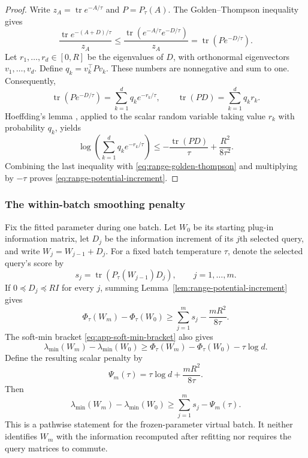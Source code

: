 \documentclass[10pt,twoside,letterpaper]{article}
\newcommand{\tr}{\operatorname{tr}}
\begin{document}
\begin{proof}
Write $z_A=\tr e^{-A/\tau}$ and $P=P_\tau(A)$.
The Golden--Thompson inequality \citep{Golden1965,Thompson1965}
gives
\begin{equation}
\frac{\tr e^{-(A+D)/\tau}}{z_A}
\le
\frac{\tr\!\left(e^{-A/\tau}e^{-D/\tau}\right)}{z_A}
=
\tr\!\left(Pe^{-D/\tau}\right).
\label{eq:range-golden-thompson}
\end{equation}
Let $r_1,\ldots,r_d\in[0,R]$ be the eigenvalues of $D$, with
orthonormal eigenvectors $v_1,\ldots,v_d$. Define
$q_k=v_k^\top Pv_k$. These numbers are nonnegative and sum to one.
Consequently,
\begin{equation}
\tr\!\left(Pe^{-D/\tau}\right)
=\sum_{k=1}^d q_k e^{-r_k/\tau},
\qquad
\tr(PD)=\sum_{k=1}^d q_k r_k.
\end{equation}
Hoeffding's lemma \citep{Hoeffding1963}, applied to the scalar
random variable taking value $r_k$ with probability $q_k$, yields
\begin{equation}
\log\!\left(\sum_{k=1}^d q_k e^{-r_k/\tau}\right)
\le
-\frac{\tr(PD)}{\tau}+\frac{R^2}{8\tau^2}.
\label{eq:range-hoeffding}
\end{equation}
Combining the last inequality with
\eqref{eq:range-golden-thompson} and multiplying by $-\tau$
proves \eqref{eq:range-potential-increment}.
\end{proof}

\subsubsection{The within-batch smoothing penalty}

Fix the fitted parameter during one batch. Let $W_0$ be its starting
plug-in information matrix, let $D_j$ be the information increment
of its $j$th selected query, and write $W_j=W_{j-1}+D_j$.
For a fixed batch temperature $\tau$, denote the selected query's
score by
\begin{equation}
s_j=\tr\!\left(P_\tau(W_{j-1})D_j\right),
\qquad j=1,\ldots,m.
\end{equation}
If $0\preceq D_j\preceq RI$ for every $j$, summing
Lemma~\ref{lem:range-potential-increment} gives
\begin{equation}
\Phi_\tau(W_m)-\Phi_\tau(W_0)
\ge
\sum_{j=1}^m s_j-\frac{mR^2}{8\tau}.
\label{eq:range-batch-potential}
\end{equation}
The soft-min bracket \eqref{eq:app-soft-min-bracket} also gives
\begin{equation}
\lambda_{\min}(W_m)-\lambda_{\min}(W_0)
\ge
\Phi_\tau(W_m)-\Phi_\tau(W_0)-\tau\log d.
\end{equation}
Define the resulting scalar penalty by
\begin{equation}
\Psi_m(\tau)=\tau\log d+\frac{mR^2}{8\tau}.
\label{eq:range-penalty}
\end{equation}
Then
\begin{equation}
\lambda_{\min}(W_m)-\lambda_{\min}(W_0)
\ge
\sum_{j=1}^m s_j-\Psi_m(\tau).
\label{eq:range-batch-eigenvalue}
\end{equation}
This is a pathwise statement for the frozen-parameter virtual batch.
It neither identifies $W_m$ with the information recomputed after
refitting nor requires the query matrices to commute.
\end{document}
